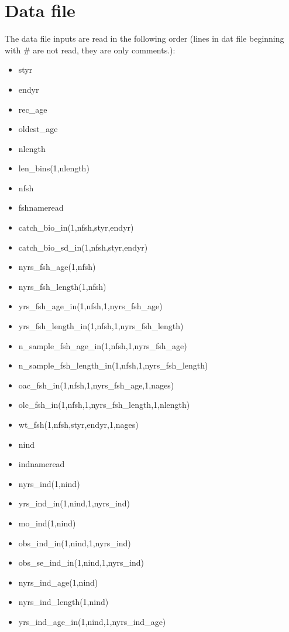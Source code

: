 \documentclass{article}
\begin{document}
\section{Data file}
The data file inputs are read in the following order (lines in dat file beginning with \# are not read, they are only comments.):
\begin{itemize}
    \item styr
    \item endyr
    \item rec\_age
    \item oldest\_age
    \item nlength
    \item len\_bins(1,nlength)
    \item nfsh
    \item fshnameread
    \item catch\_bio\_in(1,nfsh,styr,endyr)
    \item catch\_bio\_sd\_in(1,nfsh,styr,endyr)
    \item nyrs\_fsh\_age(1,nfsh)
    \item nyrs\_fsh\_length(1,nfsh)
    \item yrs\_fsh\_age\_in(1,nfsh,1,nyrs\_fsh\_age)
    \item yrs\_fsh\_length\_in(1,nfsh,1,nyrs\_fsh\_length)
    \item n\_sample\_fsh\_age\_in(1,nfsh,1,nyrs\_fsh\_age)
    \item n\_sample\_fsh\_length\_in(1,nfsh,1,nyrs\_fsh\_length)
    \item oac\_fsh\_in(1,nfsh,1,nyrs\_fsh\_age,1,nages)
    \item olc\_fsh\_in(1,nfsh,1,nyrs\_fsh\_length,1,nlength)
    \item wt\_fsh(1,nfsh,styr,endyr,1,nages)
    \item nind 
    \item indnameread
    \item nyrs\_ind(1,nind)
    \item yrs\_ind\_in(1,nind,1,nyrs\_ind)
    \item mo\_ind(1,nind)
    \item obs\_ind\_in(1,nind,1,nyrs\_ind)
    \item obs\_se\_ind\_in(1,nind,1,nyrs\_ind)
    \item nyrs\_ind\_age(1,nind)
    \item nyrs\_ind\_length(1,nind)
    \item yrs\_ind\_age\_in(1,nind,1,nyrs\_ind\_age)

\end{itemize}
\end{document}
